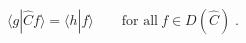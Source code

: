 \begin{equation}
\langle g | \hat{C} f \rangle = \langle h | f \rangle \qquad
\mbox{for all} \ f \in D(\hat{C} )\;.
\label{G8}
\end{equation}

